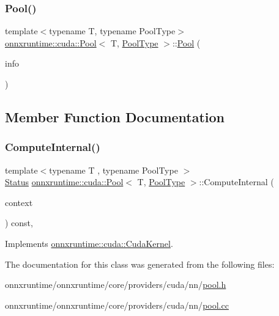 \subsubsection{\texorpdfstring{Pool()}{Pool()}}
{\footnotesize\ttfamily template$<$typename T, typename Pool\+Type$>$ \\
\mbox{\hyperlink{classonnxruntime_1_1cuda_1_1Pool}{onnxruntime\+::cuda\+::\+Pool}}$<$ T, \mbox{\hyperlink{namespaceonnxruntime_aa4ff52f19ea8c4d3e4ce3ffbabbc7060}{Pool\+Type}} $>$\+::\mbox{\hyperlink{classonnxruntime_1_1cuda_1_1Pool}{Pool}} (\begin{DoxyParamCaption}\item[{\mbox{\hyperlink{classonnxruntime_1_1OpKernelInfo}{Op\+Kernel\+Info}}}]{info }\end{DoxyParamCaption})\hspace{0.3cm}{\ttfamily [inline]}}



\subsection{Member Function Documentation}
\mbox{\label{classonnxruntime_1_1cuda_1_1Pool_a682669ecd41f68812a68dc19c820d5be}} 
\subsubsection{\texorpdfstring{Compute\+Internal()}{ComputeInternal()}}
{\footnotesize\ttfamily template$<$typename T , typename Pool\+Type $>$ \\
\mbox{\hyperlink{classonnxruntime_1_1common_1_1Status}{Status}} \mbox{\hyperlink{classonnxruntime_1_1cuda_1_1Pool}{onnxruntime\+::cuda\+::\+Pool}}$<$ T, \mbox{\hyperlink{namespaceonnxruntime_aa4ff52f19ea8c4d3e4ce3ffbabbc7060}{Pool\+Type}} $>$\+::Compute\+Internal (\begin{DoxyParamCaption}\item[{\mbox{\hyperlink{classonnxruntime_1_1OpKernelContext}{Op\+Kernel\+Context}} $\ast$}]{context }\end{DoxyParamCaption}) const\hspace{0.3cm}{\ttfamily [override]}, {\ttfamily [virtual]}}



Implements \mbox{\hyperlink{classonnxruntime_1_1cuda_1_1CudaKernel_aca7af04ae448017d6023d30bba231ebb}{onnxruntime\+::cuda\+::\+Cuda\+Kernel}}.



The documentation for this class was generated from the following files\+:\begin{DoxyCompactItemize}
\item 
onnxruntime/onnxruntime/core/providers/cuda/nn/\mbox{\hyperlink{cuda_2nn_2pool_8h}{pool.\+h}}\item 
onnxruntime/onnxruntime/core/providers/cuda/nn/\mbox{\hyperlink{cuda_2nn_2pool_8cc}{pool.\+cc}}\end{DoxyCompactItemize}
